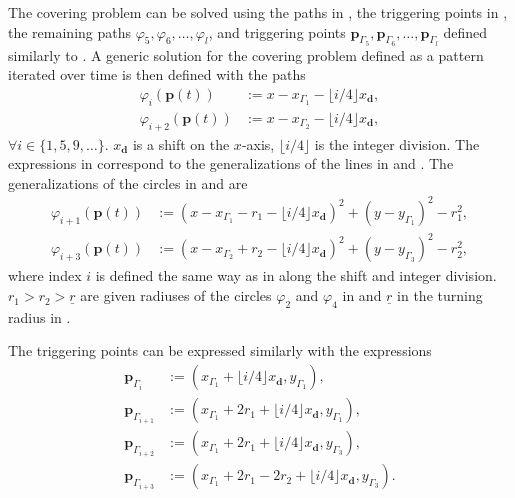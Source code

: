 The covering problem can be solved using the paths in , the triggering points in , the remaining paths $\varphi_5,\varphi_6,\dots,\varphi_l$, and triggering points $\mathbf{p}_{\Gamma_5},\mathbf{p}_{\Gamma_6},\dots,\mathbf{p}_{\Gamma_l}$ defined similarly to . A generic solution for the covering problem defined as a pattern iterated over time is then defined with the paths
\begin{subequations}\label{eq:line-gene}\begin{align}
  \varphi_i(\mathbf{p}(t))&:=x-x_{\Gamma_1}-\lfloor i/4\rfloor x_\mathbf{d},\\
  \varphi_{i+2}(\mathbf{p}(t))&:=x-x_{\Gamma_2}-\lfloor i/4\rfloor x_\mathbf{d},
\end{align}
\end{subequations}
$\forall i\in\{1,5,9,\dots\}$. $x_\mathbf{d}$ is a shift on the $x$-axis, $\lfloor i/4\rfloor$ is the integer division. The expressions in  correspond to the generalizations of the lines in  and . The generalizations of the circles in  and  are
\begin{subequations}\label{eq:circ-gene}\begin{align}
  \varphi_{i+1}(\mathbf{p}(t))&:=(x-x_{\Gamma_1}-r_1-\lfloor i/4\rfloor x_\mathbf{d})^2+(y-y_{\Gamma_1})^2-r_1^2,\\
  \varphi_{i+3}(\mathbf{p}(t))&:=(x-x_{\Gamma_2}+r_2-\lfloor i/4\rfloor x_\mathbf{d})^2+(y-y_{\Gamma_3})^2-r_2^2,\label{eq:second-circ-gene}
\end{align}
\end{subequations}
where index $i$ is defined the same way as in  along the shift and integer division. $r_1>r_2>\underline{r}$ are given radiuses of the circles $\varphi_2$ and $\varphi_4$ in  and $\underline{r}$ in the turning radius in .

The triggering points can be expressed similarly with the expressions
\begin{subequations}\label{eq:trigs-gene}\begin{align}
  \mathbf{p}_{\Gamma_i}&:=(x_{\Gamma_1}+\lfloor i/4\rfloor x_\mathbf{d},y_{\Gamma_1}),\\
  \mathbf{p}_{\Gamma_{i+1}}&:=(x_{\Gamma_1}+2r_1+\lfloor i/4\rfloor x_\mathbf{d},y_{\Gamma_1}),\\
  \mathbf{p}_{\Gamma_{i+2}}&:=(x_{\Gamma_1}+2r_1+\lfloor i/4\rfloor x_\mathbf{d},y_{\Gamma_3}),\\
  \mathbf{p}_{\Gamma_{i+3}}&:=(x_{\Gamma_1}+2r_1-2r_2+\lfloor i/4\rfloor x_\mathbf{d},y_{\Gamma_3})\label{eq:last-trig-gene}.
\end{align}
\end{subequations}


